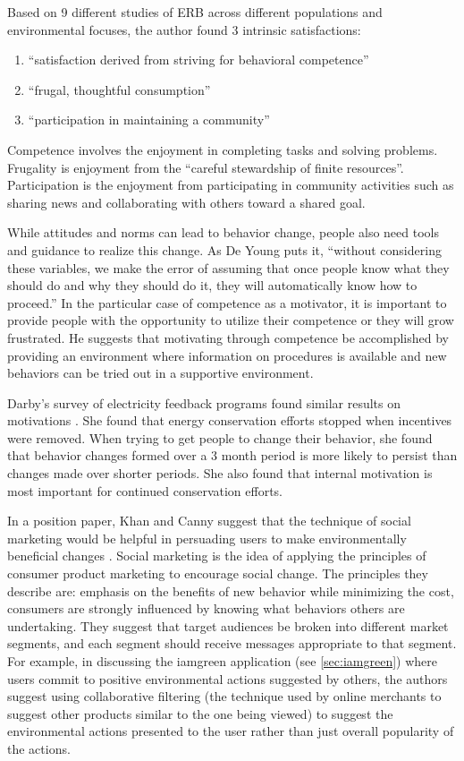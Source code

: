 Based on 9 different studies of ERB across different populations and environmental focuses, the author found 3 intrinsic satisfactions:
\begin{enumerate}
	\item ``satisfaction derived from striving for behavioral competence''
	\item ``frugal, thoughtful consumption''
	\item ``participation in maintaining a community''
\end{enumerate}

Competence involves the enjoyment in completing tasks and solving problems. Frugality is enjoyment from the ``careful stewardship of finite resources''. Participation is the enjoyment from participating in community activities such as sharing news and collaborating with others toward a shared goal.

While attitudes and norms can lead to behavior change, people also need tools and guidance to realize this change. As De Young puts it, ``without considering these variables, we make the error of assuming that once people know what they should do and why they should do it, they will automatically know how to proceed.'' In the particular case of competence as a motivator, it is important to provide people with the opportunity to utilize their competence or they will grow frustrated. He suggests that motivating through competence be accomplished by providing an environment where information on procedures is available and new behaviors can be tried out in a supportive environment.

Darby's survey of electricity feedback programs found similar results on motivations \cite{darby-review-2006}. She found that energy conservation efforts stopped when incentives were removed. When trying to get people to change their behavior, she found that behavior changes formed over a 3 month period is more likely to persist than changes made over shorter periods. She also found that internal motivation is most important for continued conservation efforts.

In a position paper, Khan and Canny suggest that the technique of social marketing would be helpful in persuading users to make environmentally beneficial changes \cite{Khan2008-social-marketing}. Social marketing is the idea of applying the principles of consumer product marketing to encourage social change. The principles they describe are: emphasis on the benefits of new behavior while minimizing the cost, consumers are strongly influenced by knowing what behaviors others are undertaking. They suggest that target audiences be broken into different market segments, and each segment should receive messages appropriate to that segment. For example, in discussing the iamgreen application (see \autoref{sec:iamgreen}) where users commit to positive environmental actions suggested by others, the authors suggest using collaborative filtering (the technique used by online merchants to suggest other products similar to the one being viewed) to suggest the environmental actions presented to the user rather than just overall popularity of the actions.

